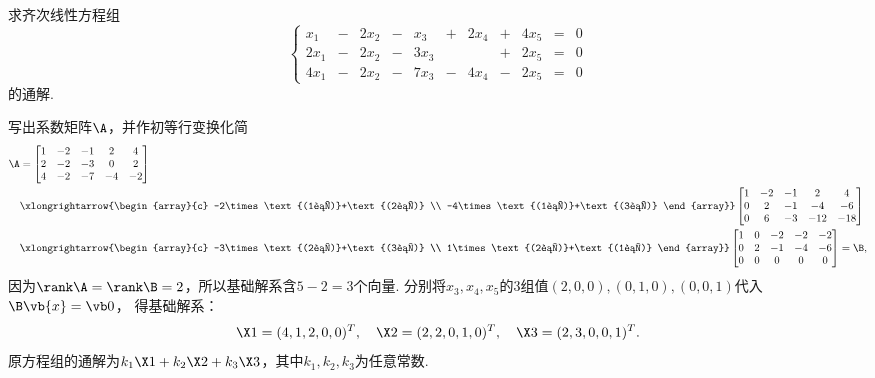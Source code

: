 \begin{example}
求齐次线性方程组\[
	\left\{ \begin{array}{*{11}{r}}
		x_1 &-& 2 x_2 &-& x_3 &+& 2 x_4 &+& 4 x_5 &=& 0 \\
		2 x_1 &-& 2 x_2 &-& 3 x_3 && &+& 2 x_5 &=& 0 \\
		4 x_1 &-& 2 x_2 &-& 7 x_3 &-& 4 x_4 &-& 2 x_5 &=& 0
	\end{array} \right.
\]的通解.
\begin{solution}
写出系数矩阵\(\A\)，并作初等行变换化简
\begin{align*}
	\A &= \begin{bmatrix}
		1 & -2 & -1 & 2 & 4 \\
		2 & -2 & -3 & 0 & 2 \\
		4 & -2 & -7 & -4 & -2
	\end{bmatrix} \\
	&\xlongrightarrow{\begin{array}{c}
		-2\times\text{(1行)}+\text{(2行)} \\
		-4\times\text{(1行)}+\text{(3行)}
	\end{array}}
	\begin{bmatrix}
		1 & -2 & -1 & 2 & 4 \\
		0 & 2 & -1 & -4 & -6 \\
		0 & 6 & -3 & -12 & -18
	\end{bmatrix} \\
	&\xlongrightarrow{\begin{array}{c}
		-3\times\text{(2行)}+\text{(3行)} \\
		1\times\text{(2行)}+\text{(1行)}
	\end{array}}
	\begin{bmatrix}
		1 & 0 & -2 & -2 & -2 \\
		0 & 2 & -1 & -4 & -6 \\
		0 & 0 & 0 & 0 & 0
	\end{bmatrix}
	= \B,
\end{align*}
因为\(\rank\A=\rank\B=2\)，所以基础解系含\(5-2=3\)个向量.
分别将\(x_3,x_4,x_5\)的3组值\((2,0,0),(0,1,0),(0,0,1)\)代入\(\B\vb{x}=\vb0\)，
得基础解系：\[
	\X1 = (4,1,2,0,0)^T, \quad
	\X2 = (2,2,0,1,0)^T, \quad
	\X3 = (2,3,0,0,1)^T.
\]
原方程组的通解为\(k_1 \X1 + k_2 \X2 + k_3 \X3\)，其中\(k_1,k_2,k_3\)为任意常数.
\end{solution}
\end{example}

